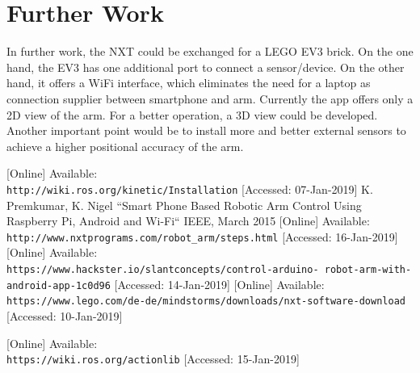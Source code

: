 \documentclass[conference]{IEEEtran}
\begin{document}
\section{Further Work}
In further work, the NXT could be exchanged for a LEGO EV3 brick. On the one hand, the EV3 has one additional port to connect a sensor/device. On the other hand, it offers a WiFi interface, which eliminates the need for a laptop as connection supplier between smartphone and arm.
Currently the app offers only a 2D view of the arm. For a better operation, a 3D view could be developed.
Another important point would be to install more and better external sensors to achieve a higher positional accuracy of the arm.

\begin{thebibliography}{00}
[Online] Available:
\\\texttt{http://wiki.ros.org/kinetic/Installation} [Accessed: 07-Jan-2019]
K. Premkumar, K. Nigel ``Smart Phone Based Robotic Arm Control Using
Raspberry Pi, Android and Wi-Fi`` IEEE, March 2015
[Online] Available:
\\\texttt{http://www.nxtprograms.com/robot\_arm/steps.html} [Accessed: 16-Jan-2019]
[Online] Available:
\\\texttt{https://www.hackster.io/slantconcepts/control-arduino-
	robot-arm-with-android-app-1c0d96} [Accessed: 14-Jan-2019]
[Online] Available:
\\\texttt{https://www.lego.com/de-de/mindstorms/downloads/nxt-software-download} [Accessed: 10-Jan-2019]

[Online] Available:
\\\texttt{https://wiki.ros.org/actionlib} [Accessed: 15-Jan-2019]


\end{thebibliography}
\end{document}

